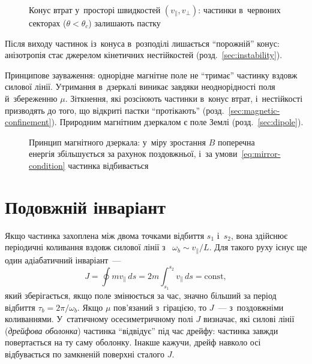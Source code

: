 \begin{figure}[ht]\centering
	\caption{Конус втрат у~просторі швидкостей $(v_\parallel,v_\perp)$: частинки в~червоних секторах ($\theta<\theta_c$) залишають пастку}
	\label{fig:loss-cone}
\end{figure}
Після виходу частинок із~конуса в~розподілі лишається \enquote{порожній} конус: анізотропія стає джерелом кінетичних нестійкостей (розд.~\ref{sec:instability}).

Принципове зауваження: однорідне магнітне поле не \enquote{тримає} частинку вздовж силової
лінії. Утримання в~дзеркалі виникає завдяки неоднорідності поля й~збереженню $\mu$.
Зіткнення, які розсіюють частинки в~конус втрат, і~нестійкості призводять до того, що
відкриті пастки \enquote{протікають} (розд.~\ref{sec:magnetic-confinement}). Природним
магнітним дзеркалом є поле Землі (розд.~\ref{sec:dipole}).

\begin{figure}[h!]\centering
	\caption{Принцип магнітного дзеркала: у~міру зростання $B$ поперечна енергія
	збільшується за рахунок поздовжньої, і~за умови~\eqref{eq:mirror-condition} частинка
	відбивається}
	\label{pic:magnetic-mirror}
\end{figure}

\section{Подовжній інваріант}\label{sec:longitudinal-invariant}

Якщо частинка захоплена між двома точками відбиття $s_1$ і~$s_2$, вона здійснює періодичні
коливання вздовж силової лінії з~ $\omega_b\sim v_\parallel/L$. Для
такого руху існує ще один адіабатичний інваріант~--- 
\begin{equation}\label{eq:J-invariant}
	J=\oint m v_\parallel\,ds=2m\int_{s_1}^{s_2}v_\parallel\,ds=\mathrm{const},
\end{equation}
який зберігається, якщо поле змінюється за час, значно більший за період відбиття
$\tau_b=2\pi/\omega_b$. Якщо $\mu$ пов'язаний з~гірацією, то $J$~--- з~поздовжніми коливаннями.
У~статичному осесиметричному полі $J$ визначає, які силові лінії (\emph{дрейфова
оболонка}) частинка \enquote{відвідує} під час дрейфу: частинка завжди повертається на ту саму
оболонку. Інакше кажучи, дрейф навколо осі відбувається по замкненій поверхні сталого $J$.

